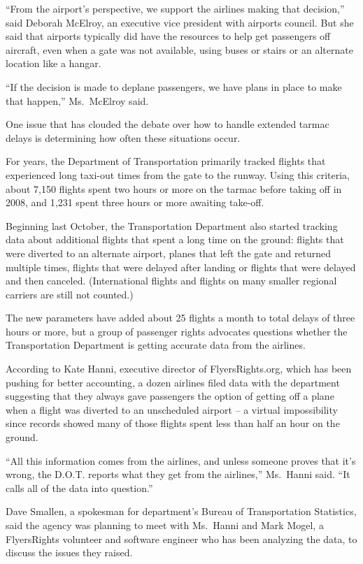 \documentclass[12pt,a4paper,onecolumn]{article}
\begin{document}
``From the airport's perspective, we support the airlines making that decision,'' said Deborah
McElroy, an executive vice president with airports council. But she said that airports typically did
have the resources to help get passengers off aircraft, even when a gate was not available, using
buses or stairs or an alternate location like a hangar.

``If the decision is made to deplane passengers, we have plans in place to make that happen,''
Ms.~McElroy said.

One issue that has clouded the debate over how to handle extended tarmac delays is determining how
often these situations occur.

For years, the Department of Transportation primarily tracked flights that experienced long taxi-out
times from the gate to the runway. Using this criteria, about 7,150 flights spent two hours or more
on the tarmac before taking off in 2008, and 1,231 spent three hours or more awaiting take-off.

Beginning last October, the Transportation Department also started tracking data about additional
flights that spent a long time on the ground: flights that were diverted to an alternate airport,
planes that left the gate and returned multiple times, flights that were delayed after landing or
flights that were delayed and then canceled. (International flights and flights on many smaller
regional carriers are still not counted.)

The new parameters have added about 25 flights a month to total delays of three hours or more, but a
group of passenger rights advocates questions whether the Transportation Department is getting
accurate data from the airlines.

According to Kate Hanni, executive director of FlyersRights.org, which has been pushing for better
accounting, a dozen airlines filed data with the department suggesting that they always gave
passengers the option of getting off a plane when a flight was diverted to an unscheduled airport --
a virtual impossibility since records showed many of those flights spent less than half an hour on
the ground.

``All this information comes from the airlines, and unless someone proves that it's wrong, the
D.O.T. reports what they get from the airlines,'' Ms.~Hanni said. ``It calls all of the data into
question.''

Dave Smallen, a spokesman for department's Bureau of Transportation Statistics, said the agency was
planning to meet with Ms.~Hanni and Mark Mogel, a FlyersRights volunteer and software engineer who
has been analyzing the data, to discuss the issues they raised.
\end{document}
